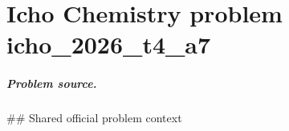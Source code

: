 
\chapter{Icho Chemistry problem icho\_2026\_t4\_a7}
\label{ch:IChO2026Problems_problem_icho_2026_t4_a7}

\paragraph{Problem source.}
\#\# Shared official problem context
